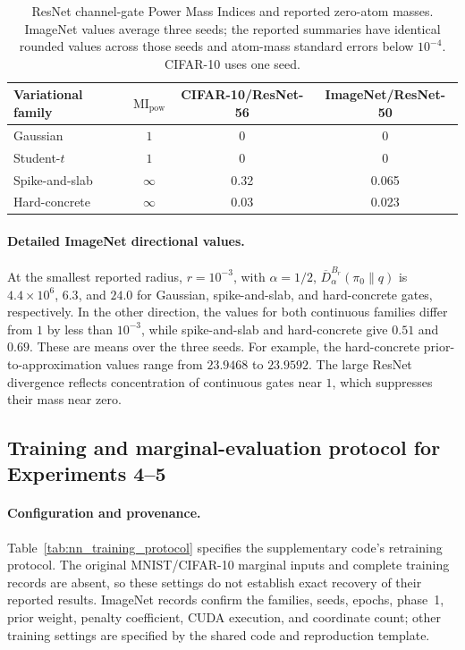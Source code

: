\documentclass[11pt,a4paper]{article}
\newcommand{\MI}{\mathrm{MI}}
\theoremstyle{compactplain}
\theoremstyle{compactdefinition}
\numberwithin{equation}{section}
\begin{document}
\begin{table}[t]
\centering
\caption{ResNet channel-gate Power Mass Indices and reported zero-atom
masses. ImageNet values average three seeds; the reported summaries
have identical rounded values across those seeds and atom-mass standard
errors below \(10^{-4}\). CIFAR-10 uses one seed.}
\label{tab:nn_resnet}
\begin{tabular}{lccc}
\toprule
Variational family & \(\MI_{\mathrm{pow}}\) &
CIFAR-10/ResNet-56 & ImageNet/ResNet-50 \\
\midrule
Gaussian & \(1\) & 0 & 0 \\
Student-\(t\) & \(1\) & 0 & 0 \\
Spike-and-slab & \(\infty\) & 0.32 & 0.065 \\
Hard-concrete & \(\infty\) & 0.03 & 0.023 \\
\bottomrule
\end{tabular}
\end{table}

\paragraph{Detailed ImageNet directional values.}
At the smallest reported radius, \(r=10^{-3}\), with \(\alpha=1/2\),
\(\overline D_\alpha^{B_r}(\pi_0\|q)\) is \(4.4\times10^6\),
\(6.3\), and \(24.0\) for Gaussian, spike-and-slab, and hard-concrete
gates, respectively. In the other direction, the values for both
continuous families differ from \(1\) by less than \(10^{-3}\), while
spike-and-slab and hard-concrete give \(0.51\) and \(0.69\).
These are means over the three seeds. For example, the hard-concrete
prior-to-approximation values range from \(23.9468\) to \(23.9592\).
The large ResNet divergence reflects concentration of continuous gates
near \(1\), which suppresses their mass near zero.

\subsection{Training and marginal-evaluation protocol for Experiments 4--5}
\label{app:nn_protocol}

\paragraph{Configuration and provenance.}
Table~\ref{tab:nn_training_protocol} specifies the supplementary code's
retraining protocol. The original MNIST/CIFAR-10 marginal inputs and
complete training records are absent, so these settings do not establish
exact recovery of their reported results. ImageNet records confirm the
families, seeds, epochs, phase~1, prior weight, penalty coefficient,
CUDA execution, and coordinate count; other training settings are
specified by the shared code and reproduction template.
\end{document}
